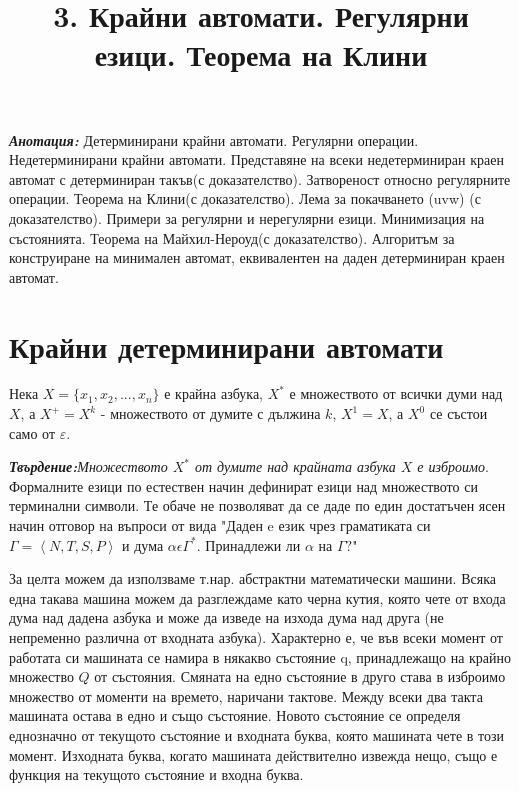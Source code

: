 \documentclass[11pt]{article}
\title{3. Крайни автомати. Регулярни езици. Теорема на Клини}
\begin{document}
\maketitle

\textbf{\textit{Анотация:}} Детерминирани крайни автомати. Регулярни операции. Недетерминирани крайни автомати. Представяне на всеки недетерминиран краен автомат с детерминиран такъв(с доказателство). Затвореност относно регулярните операции. Теорема на Клини(с доказателство). Лема за покачването (uvw) (с доказателство). Примери за регулярни и нерегулярни езици. Минимизация на състоянията. Теорема на Майхил-Нероуд(с доказателство). Алгоритъм за конструиране на минимален автомат, еквивалентен на даден детерминиран краен автомат.
\newcommand{\lrangle}[1]{\left\langle #1 \right\rangle}

\newcommand{\belongsTo}{\in}
\newcommand{\notBelongsTo}{\centernot\in}
\newcommand{\kda}{A = <Q, X, q_{0}, \delta, F>}

\newcommand{\italicBold}[1]{\textbf{\emph{#1}}}
\newcommand{\definition}{\italicBold{Дефиниция:}}
\newcommand{\theorem}{\italicBold{Теорема:}}
\newcommand{\lemma}{\italicBold{Лема:}}
\newcommand{\proof}{\italicBold{Доказателство:}}

\newcommand{\curlies}[1]{\{#1\}}

\section{Крайни детерминирани автомати}
Нека $X = \{x_1, x_2, ..., x_n\}$ е крайна азбука, $X^*$ е множеството от всички думи над $X$, а $X^{+} = X^{k}$ - множеството от думите с дължина $k$, $X^{1} = X$, а $X^{0}$ се състои само от $\varepsilon$. \par

\italicBold{Твърдение:}\emph{Множеството $X^{*}$ от думите над крайната азбука $X$ е изброимо}. \\

Формалните езици по естествен начин дефинират езици над множеството си терминални символи. Те обаче не позволяват да се даде по един достатъчен ясен начин отговор на въпроси от вида "Даден e език чрез граматиката си $\Gamma = \left\langle N, T, S, P \right\rangle$ и дума $\alpha \epsilon \Gamma^*.$ Принадлежи ли $\alpha$ на $\Gamma?$" \par

За целта можем да използваме т.нар. абстрактни математически машини. Всяка една такава машина можем да разглеждаме като черна кутия, която чете от входа дума над дадена азбука и може да изведе на изхода дума над друга (не непременно различна от входната азбука). Характерно е, че във всеки момент от работата си машината се намира в някакво състояние q, принадлежащо на крайно множество $Q$ от състояния. Смяната на едно състояние в друго става в изброимо множество от моменти на времето, наричани тактове. Между всеки два такта машината остава в едно и също състояние. Новото състояние се определя еднозначно от текущото състояние и входната буква, която машината чете в този момент. Изходната буква, когато машината действително извежда нещо, също е функция на текущото състояние и входна буква. \par
\end{document}
